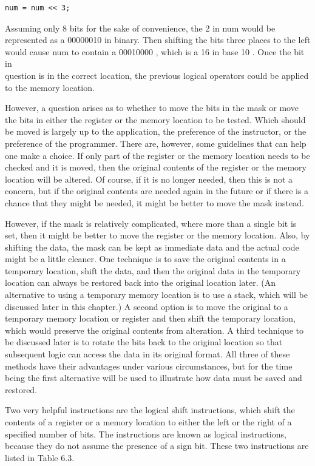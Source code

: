 \documentclass[10pt]{book}
\begin{document}
\begin{verbatim}
num = num << 3;
\end{verbatim}

Assuming only 8 bits for the sake of convenience, the 2 in num would be represented as a 00000010 in binary. Then shifting the bits three places to the left would cause num to contain a 00010000 , which is a 16 in base 10 . Once the bit in\\
question is in the correct location, the previous logical operators could be applied to the memory location.


However, a question arises as to whether to move the bits in the mask or move the bits in either the register or the memory location to be tested. Which should be moved is largely up to the application, the preference of the instructor, or the preference of the programmer. There are, however, some guidelines that can help one make a choice. If only part of the register or the memory location needs to be checked and it is moved, then the original contents of the register or the memory location will be altered. Of course, if it is no longer needed, then this is not a concern, but if the original contents are needed again in the future or if there is a chance that they might be needed, it might be better to move the mask instead.

However, if the mask is relatively complicated, where more than a single bit is set, then it might be better to move the register or the memory location. Also, by shifting the data, the mask can be kept as immediate data and the actual code might be a little cleaner. One technique is to save the original contents in a temporary location, shift the data, and then the original data in the temporary location can always be restored back into the original location later. (An alternative to using a temporary memory location is to use a stack, which will be discussed later in this chapter.) A second option is to move the original to a temporary memory location or register and then shift the temporary location, which would preserve the original contents from alteration. A third technique to be discussed later is to rotate the bits back to the original location so that subsequent logic can access the data in its original format. All three of these methods have their advantages under various circumstances, but for the time being the first alternative will be used to illustrate how data must be saved and restored.

Two very helpful instructions are the logical shift instructions, which shift the contents of a register or a memory location to either the left or the right of a specified number of bits. The instructions are known as logical instructions, because they do not assume the presence of a sign bit. These two instructions are listed in Table 6.3.
\end{document}
